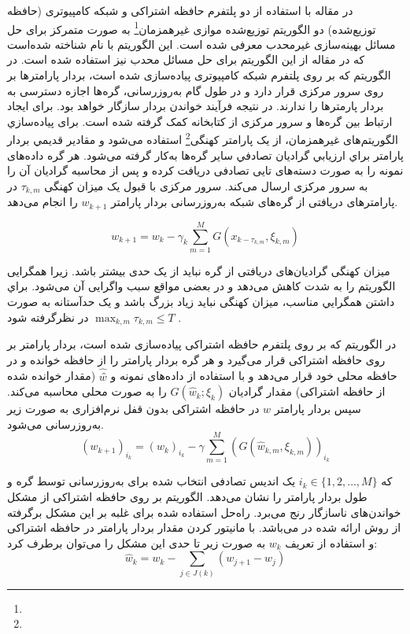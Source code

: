 در مقاله \cite{lian2019} با استفاده از دو پلتفرم حافظه اشتراکی و شبکه کامپیوتری (حافظه توزیع‌شده) دو الگوریتم  توزیع‌شده موازی غیرهمزمان\footnote{} به صورت متمرکز برای حل مسائل بهینه‌سازی غیرمحدب معرفی شده است. این الگوریتم با نام  شناخته شده‌است که در مقاله \cite{ag2011} از این الگوریتم برای حل مسائل محدب نیز استفاده شده است. در الگوریتم  \cite{lian2019} که بر روی پلتفرم شبکه‌ کامپیوتری پیاده‌سازی شده است، بردار پارامترها بر روی سرور مرکزی قرار دارد و در طول گام به‌روزرسانی، گره‌ها اجازه دسترسی به بردار پارمترها را ندارند. در نتیجه فرآیند خواندن بردار سازگار خواهد بود. برای ایجاد ارتباط بین گره‌ها و سرور مرکزی از کتابخانه  کمک گرفته شده است. برای پياده‌سازي الگوریتم‌های غيرهمزمان، از یک پارامتر کهنگی\footnote{}  استفاده می‌شود و مقادير قديمي بردار پارامتر براي ارزيابي گراديان تصادفي سایر گره‌ها به‌کار گرفته می‌شود. هر گره داده‌های نمونه را به صورت دسته‌های تایی تصادفی دریافت کرده و پس از محاسبه گرادیان آن را به سرور مرکزی ارسال می‌کند. سرور مرکزی با قبول یک میزان کهنگی $\tau _{k,m}$ در پارامترهای دریافتی از گره‌های شبکه به‌روزرسانی بردار پارامتر $w_{k+1}$ را انجام می‌دهد. 
 
 \begin{equation}\label{e23}
 	w_{k+1}=w_k-{\gamma}_k \sum_{m=1}^{M}G(x_{k-\tau_{k,m}},\xi_{k,m})
 \end{equation}
 
 میزان کهنگی گرادیان‌های دریافتی از گره نباید از یک حدی بیشتر باشد. زیرا همگرایی الگوریتم را به شدت کاهش می‌دهد و در بعضی مواقع سبب واگرایی آن می‌شود. براي داشتن همگرايي مناسب، میزان کهنگی نبايد زياد بزرگ باشد و یک حدآستانه‌ به صورت $\max_{k,m} \tau _{k,m}\le T$ در نظرگرفته شود \cite{Avron2014}.
 
در الگوریتم  \cite{lian2019} که بر روی پلتفرم حافظه اشتراکی پیاده‌سازی شده است، بردار پارامتر  بر روی حافظه اشتراکی قرار می‌گیرد و هر گره بردار پارامتر را از حافظه خوانده و در حافظه محلی خود قرار می‌دهد و با استفاده از داده‌های نمونه و $\hat{w ̂}$ (مقدار خوانده شده از حافظه اشتراکی)  مقدار گرادیان $G(\hat{w}_k;\xi_k)$ را به صورت محلی محاسبه می‌کند. سپس بردار پارامتر $w$ در حافظه اشتراکی بدون قفل نرم‌افزاری به صورت زیر به‌روزرسانی می‌شود.
 \begin{equation}\label{e24}
 	(w_{k+1})_{i_k}=(w_k)_{i_k}-\gamma \sum_{m=1}^{M}(G(\hat{w}_{k,m},\xi_{k,m}))_{i_k} 
 \end{equation}
 
 که $i_k\in \{{1,2,…,M}\}$ یک اندیس تصادفی انتخاب شده برای به‌روزرسانی توسط گره  و  طول بردار پارامتر را نشان می‌دهد. الگوریتم  بر روی حافظه اشتراکی از مشکل خواندن‌های ناسازگار رنج می‌برد. راه‌حل استفاده شده برای غلبه بر این مشکل برگرفته از روش ارائه شده در \cite{Avron2014} می‌باشد. با مانیتور کردن مقدار بردار پارامتر در حافظه اشتراکی و استفاده از تعریف  $w_k$ به صورت زیر تا حدی این مشکل را می‌توان برطرف کرد:
 \begin{equation}\label{e25}
 	\hat{w}_k=w_k-\sum_{j\in J(k)} (w_{j+1}-w_j) 
 \end{equation}
 
